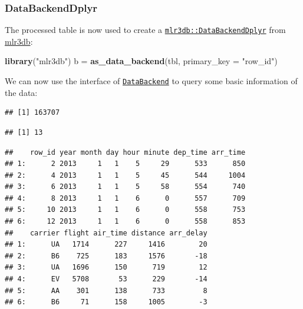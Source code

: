 \documentclass[]{article}
\newenvironment{Shaded}{\begin{snugshade}}{\end{snugshade}}
\newcommand{\DataTypeTok}[1]{\textcolor[rgb]{0.13,0.29,0.53}{#1}}
\newcommand{\KeywordTok}[1]{\textcolor[rgb]{0.13,0.29,0.53}{\textbf{#1}}}
\newcommand{\NormalTok}[1]{#1}
\newcommand{\OperatorTok}[1]{\textcolor[rgb]{0.81,0.36,0.00}{\textbf{#1}}}
\newcommand{\StringTok}[1]{\textcolor[rgb]{0.31,0.60,0.02}{#1}}
\renewenvironment{Shaded} {\begin{snugshade}\small} {\end{snugshade}}
\begin{document}
\hypertarget{databackenddplyr}{%
\subsubsection{DataBackendDplyr}\label{databackenddplyr}}

The processed table is now used to create a \href{https://mlr3db.mlr-org.com/reference/DataBackendDplyr.html}{\texttt{mlr3db::DataBackendDplyr}} from \href{https://mlr3db.mlr-org.com}{mlr3db}:

\begin{Shaded}
\begin{Highlighting}[]
\KeywordTok{library}\NormalTok{(}\StringTok{"mlr3db"}\NormalTok{)}
\NormalTok{b =}\StringTok{ }\KeywordTok{as_data_backend}\NormalTok{(tbl, }\DataTypeTok{primary_key =} \StringTok{"row_id"}\NormalTok{)}
\end{Highlighting}
\end{Shaded}

We can now use the interface of \href{https://mlr3.mlr-org.com/reference/DataBackend.html}{\texttt{DataBackend}} to query some basic information of the data:

\begin{Shaded}
\end{Shaded}

\begin{verbatim}
## [1] 163707
\end{verbatim}

\begin{Shaded}
\end{Shaded}

\begin{verbatim}
## [1] 13
\end{verbatim}

\begin{Shaded}
\end{Shaded}

\begin{verbatim}
##    row_id year month day hour minute dep_time arr_time
## 1:      2 2013     1   1    5     29      533      850
## 2:      4 2013     1   1    5     45      544     1004
## 3:      6 2013     1   1    5     58      554      740
## 4:      8 2013     1   1    6      0      557      709
## 5:     10 2013     1   1    6      0      558      753
## 6:     12 2013     1   1    6      0      558      853
##    carrier flight air_time distance arr_delay
## 1:      UA   1714      227     1416        20
## 2:      B6    725      183     1576       -18
## 3:      UA   1696      150      719        12
## 4:      EV   5708       53      229       -14
## 5:      AA    301      138      733         8
## 6:      B6     71      158     1005        -3
\end{verbatim}
\end{document}

